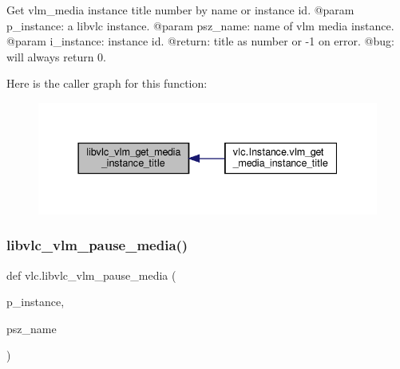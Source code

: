 \begin{DoxyVerb}Get vlm_media instance title number by name or instance id.
@param p_instance: a libvlc instance.
@param psz_name: name of vlm media instance.
@param i_instance: instance id.
@return: title as number or -1 on error.
@bug: will always return 0.
\end{DoxyVerb}
 Here is the caller graph for this function\+:
\nopagebreak
\begin{figure}[H]
\begin{center}
\leavevmode
\includegraphics[width=337pt]{namespacevlc_aa50fef0c1e8a8a03f23275fca6642a1e_icgraph}
\end{center}
\end{figure}
\mbox{\label{namespacevlc_aaad0efdc3c62f78fc9653c58d562e323}} 
\subsubsection{\texorpdfstring{libvlc\+\_\+vlm\+\_\+pause\+\_\+media()}{libvlc\_vlm\_pause\_media()}}
{\footnotesize\ttfamily def vlc.\+libvlc\+\_\+vlm\+\_\+pause\+\_\+media (\begin{DoxyParamCaption}\item[{}]{p\+\_\+instance,  }\item[{}]{psz\+\_\+name }\end{DoxyParamCaption})}

